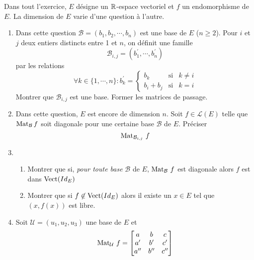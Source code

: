 Dans tout l'exercice, $E$ désigne un $\mathbb{R}$-espace vectoriel et $f$ un endomorphisme de $E$. La dimension de $E$ varie d'une question à l'autre.
\begin{enumerate}
\item Dans cette question $\mathcal{B}=(b_1,b_2,\cdots, b_n)$ est une base de $E$  ($n\geq 2$). Pour $i$ et $j$ deux entiers distincts entre 1 et $n$, on définit une famille
\[\mathcal{B}_{i,j}=(b^\prime _1,\cdots , b^\prime _n)\]
par les relations
\begin{displaymath}
\forall k \in \{1,\cdots,n\} : 
b^\prime _k = \left\{
\begin{array}{ccc}
	b_k & \mathrm{si} & k \neq i \\
	b_i +b_j & \mathrm{si} & k = i 
\end{array}
\right.
\end{displaymath}
Montrer que $\mathcal{B}_{i,j}$ est une base. Former les matrices de passage.

\item Dans cette question, $E$ est encore de dimension $n$. Soit $f\in \mathcal{L}(E)$ telle que ${\operatorname{Mat}}_{\mathcal{B}}\, f$ soit diagonale pour une certaine base $\mathcal B$ de $E$. Préciser 
\begin{displaymath}
 \operatorname{Mat}_{\mathcal{B}_{i,j}}\,f
\end{displaymath}

\item \begin{enumerate}
 \item Montrer que si, \emph{pour toute base} $\mathcal B$ de $E$, ${\operatorname{Mat}_{\mathcal{B}}\, f}$ est diagonale alors  $f$ est dans $\operatorname{Vect} (Id_E)$
 \item Montrer que si $f\not \in \operatorname{Vect}(Id_E)$ alors il  existe un $x\in E$ tel que $(x,f(x))$ est libre.
\end{enumerate}

\item Soit $\mathcal{U}=(u_1,u_2,u_3)$ une base de $E$ et 
\begin{displaymath}
\operatorname{Mat}_{\mathcal{U}}\, f = 
\begin{bmatrix}
 a & b & c \\
a^\prime & b^\prime & c^\prime \\
a^{\prime\prime} & b^{\prime\prime} & c^{\prime\prime}
\end{bmatrix}
\end{displaymath}


\end{enumerate}

